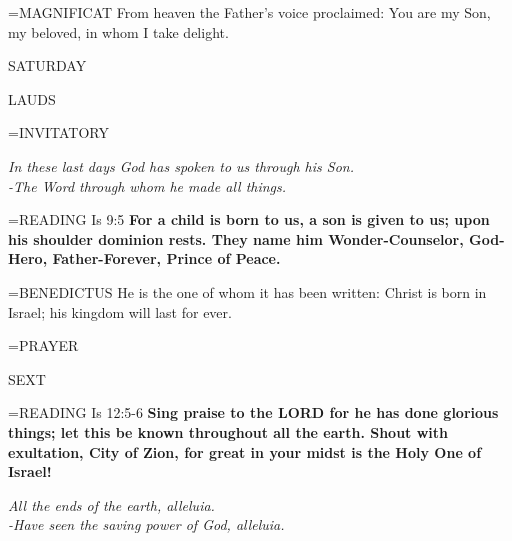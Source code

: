 \hangindent=\parindent \small{MAGNIFICAT 	From heaven the Father's voice proclaimed: You are my Son, my beloved, in whom I take delight.\\}

\begin{center}
\normalsize SATURDAY
\end{center}

\begin{flushleft}\normalsize LAUDS\\\end{flushleft}

\hangindent=\parindent \small{INVITATORY}
\begin{center}
\textit{In these last days God has spoken to us through his Son.\\}
\textit{-The Word through whom he made all things.\\}
\end{center}

\hangindent=\parindent \small{READING}    Is 9:5 \textbf{   For a child is born to us, a son is given to us; upon his shoulder dominion rests. They name him Wonder-Counselor, God-Hero, Father-Forever, Prince of Peace.\\}

\hangindent=\parindent \small{BENEDICTUS 	He is the one of whom it has been written: Christ is born in Israel; his kingdom will last for ever.\\}

\hangindent=\parindent \small{PRAYER 	}

\begin{flushleft}\normalsize SEXT\\\end{flushleft}

\hangindent=\parindent \small{READING}    Is 12:5-6 \textbf{   Sing praise to the LORD for he has done glorious things; let this be known throughout all the earth. Shout with exultation, City of Zion, for great in your midst is the Holy One of Israel!}

\begin{center}
\textit{All the ends of the earth, alleluia.\\
-Have seen the saving power of God, alleluia.}
\end{center}

